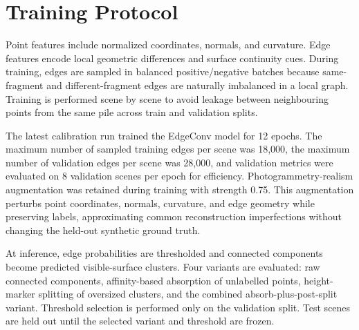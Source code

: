 \documentclass[11pt]{article}
\begin{document}
\section{Training Protocol}
Point features include normalized coordinates, normals, and curvature. Edge features encode local geometric differences and surface continuity cues. During training, edges are sampled in balanced positive/negative batches because same-fragment and different-fragment edges are naturally imbalanced in a local graph. Training is performed scene by scene to avoid leakage between neighbouring points from the same pile across train and validation splits.

The latest calibration run trained the EdgeConv model for 12 epochs. The maximum number of sampled training edges per scene was 18,000, the maximum number of validation edges per scene was 28,000, and validation metrics were evaluated on 8 validation scenes per epoch for efficiency. Photogrammetry-realism augmentation was retained during training with strength 0.75. This augmentation perturbs point coordinates, normals, curvature, and edge geometry while preserving labels, approximating common reconstruction imperfections without changing the held-out synthetic ground truth.

At inference, edge probabilities are thresholded and connected components become predicted visible-surface clusters. Four variants are evaluated: raw connected components, affinity-based absorption of unlabelled points, height-marker splitting of oversized clusters, and the combined absorb-plus-post-split variant. Threshold selection is performed only on the validation split. Test scenes are held out until the selected variant and threshold are frozen.
\end{document}
